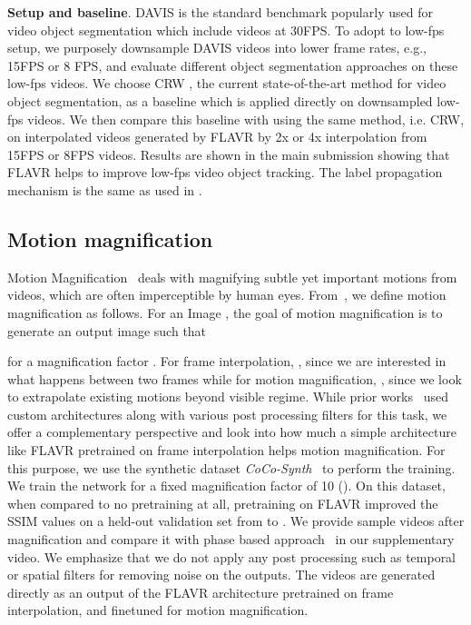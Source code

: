 \documentclass[10pt,twocolumn,letterpaper]{article}
\newcommand{\Ours}{FLAVR}
\begin{document}
\begin{table*}[!t]
{\bf Setup and baseline}. DAVIS is the standard benchmark popularly used for video object segmentation which include videos at 30FPS. To adopt to low-fps setup, we purposely downsample DAVIS videos into lower frame rates, e.g., 15FPS or 8 FPS, and evaluate different object segmentation approaches on these low-fps videos. We choose CRW \cite{jabri2020space}, the current state-of-the-art method for video object segmentation, as a baseline which is applied directly on downsampled low-fps videos. We then compare this baseline with using the same method, i.e. CRW, on interpolated videos generated by \Ours{} by 2x or 4x interpolation from 15FPS or 8FPS videos. Results are shown in the main submission showing that \Ours{} helps to improve low-fps video object tracking. The label propagation mechanism is the same as used in \cite{jabri2020space}.

\subsection{Motion magnification}
\label{appendix:motion_magnification}

Motion Magnification~\cite{oh2018learning, wu2012eulerian, Wadhwa13PhaseBased} deals with magnifying subtle yet important motions from videos, which are often imperceptible by human eyes. From~\cite{oh2018learning}, we define motion magnification as follows. For an Image , the goal of motion magnification is to generate an output image  such that



\noindent for a magnification factor . For frame interpolation, , since we are interested in what happens between two frames while for motion magnification, , since we look to extrapolate existing motions beyond visible regime. While prior works~\cite{oh2018learning, wu2012eulerian, Wadhwa13PhaseBased} used custom architectures along with various post processing filters for this task, we offer a complementary perspective and look into how much a simple architecture like FLAVR pretrained on frame interpolation helps motion magnification. For this purpose, we use the synthetic dataset \textit{CoCo-Synth}~\cite{oh2018learning} to perform the training. We train the network for a fixed magnification factor of 10 (). On this dataset, when compared to no pretraining at all, pretraining on \Ours{} improved the SSIM values on a held-out validation set from  to . We provide sample videos after magnification and compare it with phase based approach~\cite{wu2012eulerian} in our supplementary video. We emphasize that we do not apply any post processing such as temporal or spatial filters for removing noise on the outputs. The videos are generated directly as an output of the FLAVR architecture pretrained on frame interpolation, and finetuned for motion magnification.


\end{table*}
\end{document}
